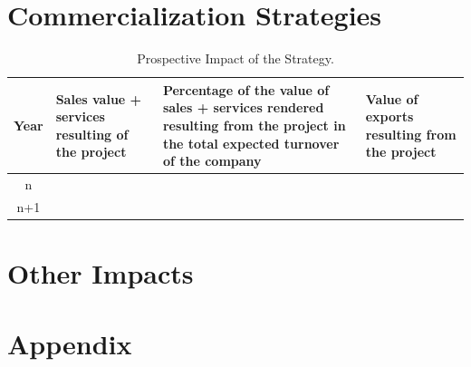 \documentclass{ani}
\begin{document}
\chapter{Commercialization Strategies}
\begin{table}[!htp]
  \centering
  \scriptsize
  
  \begin{tabular}{c|p{}p{}p{}}
    \hline\hline
    \textbf{Year} & \textbf{Sales value + services resulting of the project} & \textbf{Percentage of the value of sales + services rendered resulting from the project in the total expected turnover of the company} & \textbf{Value of exports resulting from the project}\\ \hline
    n   & & & \\ \hline
    n+1 & & & \\ \hline
    \hline
  \end{tabular}
  \caption{Prospective Impact of the Strategy.} 
\end{table}

\chapter{Other Impacts}

\chapter{Appendix}

\nocite{*}


\end{document}
